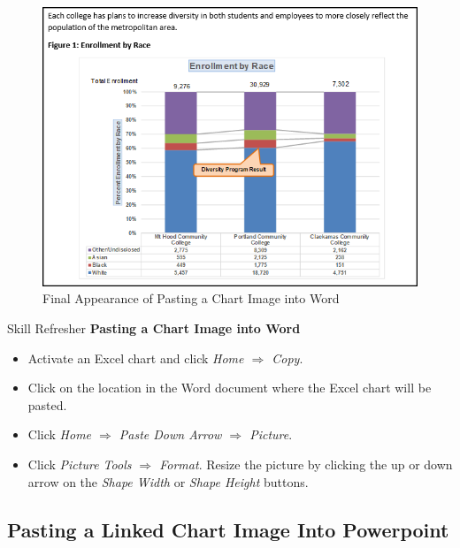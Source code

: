 \begin{figure}[H]
	\centering
	\includegraphics[width=\maxwidth{.95\linewidth}]{gfx/ch04_fig48}
	\caption{Final Appearance of Pasting a Chart Image into Word}
	\label{04:fig48}
\end{figure}

\begin{center}
	\begin{sklbox}{Skill Refresher}
		\textbf{Pasting a Chart Image into Word}
		\\
		\begin{itemize}
			\setlength{\itemsep}{0pt}
			\setlength{\parskip}{0pt}
			\setlength{\parsep}{0pt}

			\item Activate an Excel chart and click \textit{Home $ \Rightarrow $ Copy}.
			\item Click on the location in the Word document where the Excel chart will be pasted.
			\item Click \textit{Home $ \Rightarrow $ Paste Down Arrow $ \Rightarrow $ Picture}.
			\item Click \textit{Picture Tools $ \Rightarrow $ Format}. Resize the picture by clicking the up or down arrow on the \textit{Shape Width} or \textit{Shape Height} buttons.
			
		\end{itemize}
	\end{sklbox}
\end{center}

\subsection{Pasting a Linked Chart Image Into Powerpoint}

